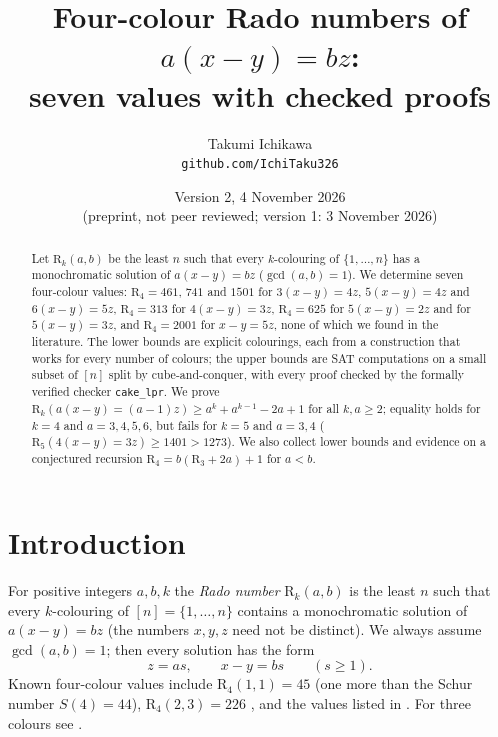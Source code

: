 \documentclass[11pt,a4paper]{article}
\title{Four-colour Rado numbers of $a(x-y)=bz$:\\[4pt]\large seven values with checked proofs}
\author{Takumi Ichikawa\\ \small\texttt{github.com/IchiTaku326}}
\date{Version 2, 4 November 2026 \\ \small (preprint, not peer reviewed; version 1: 3 November 2026)}
\theoremstyle{definition}
\theoremstyle{remark}
\newcommand{\R}{\mathrm{R}}
\begin{document}
\maketitle
\begin{abstract}
Let $\R_k(a,b)$ be the least $n$ such that every $k$-colouring of $\{1,\dots,n\}$ has a monochromatic solution of $a(x-y)=bz$ ($\gcd(a,b)=1$).
We determine seven four-colour values: $\R_4=461$, $741$ and $1501$ for $3(x-y)=4z$, $5(x-y)=4z$ and $6(x-y)=5z$, $\R_4=313$ for $4(x-y)=3z$, $\R_4=625$ for $5(x-y)=2z$ and for $5(x-y)=3z$, and $\R_4=2001$ for $x-y=5z$, none of which we found in the literature. The lower bounds are explicit colourings, each from a construction that works for every number of colours; the upper bounds are SAT computations on a small subset of $[n]$ split by cube-and-conquer, with every proof checked by the formally verified checker \texttt{cake\_lpr}. We prove $\R_k(a(x-y)=(a-1)z)\ge a^k+a^{k-1}-2a+1$ for all $k,a\ge2$; equality holds for $k=4$ and $a=3,4,5,6$, but fails for $k=5$ and $a=3,4$ ($\R_5(4(x-y)=3z)\ge1401>1273$). We also collect lower bounds and evidence on a conjectured recursion $\R_4=b(\R_3+2a)+1$ for $a<b$.
\end{abstract}

\section{Introduction}
For positive integers $a,b,k$ the \emph{Rado number} $\R_k(a,b)$ is the least $n$ such that every $k$-colouring of $[n]=\{1,\dots,n\}$ contains a monochromatic solution of $a(x-y)=bz$ (the numbers $x,y,z$ need not be distinct). We always assume $\gcd(a,b)=1$; then every solution has the form
\[
  z=as,\qquad x-y=bs\qquad(s\ge1).
\]
Known four-colour values include $\R_4(1,1)=45$ (one more than the Schur number $S(4)=44$), $\R_4(2,3)=226$ \cite{Ich26a}, and the values listed in \cite{CDW22}. For three colours see \cite{CDW22,AZB25,Ich26b}.
\end{document}
